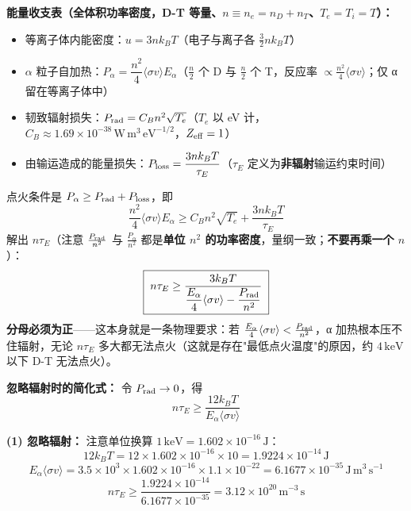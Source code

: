 \textbf{能量收支表（全体积功率密度，D-T 等量、$n\equiv n_e=n_D+n_T$、$T_e=T_i=T$）：}
\begin{itemize}
    \item 等离子体内能密度：$u=3nk_BT$（电子与离子各 $\tfrac32nk_BT$）
    \item $\alpha$ 粒子自加热：$P_\alpha=\dfrac{n^2}{4}\langle\sigma v\rangle E_\alpha$（$\tfrac{n}{2}$ 个 D 与 $\tfrac{n}{2}$ 个 T，反应率 $\propto \tfrac{n^2}{4}\langle\sigma v\rangle$；仅 α 留在等离子体中）
    \item 韧致辐射损失：$P_{\rm rad}=C_B n^2\sqrt{T_e}$（$T_e$ 以 eV 计，$C_B\approx1.69\times10^{-38}\,\mathrm{W\,m^3\,eV^{-1/2}}$，$Z_{\rm eff}=1$）
    \item 由输运造成的能量损失：$P_{\rm loss}=\dfrac{3nk_BT}{\tau_E}$（$\tau_E$ 定义为\textbf{非辐射}输运约束时间）
\end{itemize}
点火条件是 $P_\alpha\ge P_{\rm rad}+P_{\rm loss}$，即
\begin{equation}
    \frac{n^2}{4}\langle\sigma v\rangle E_\alpha \ge C_B n^2\sqrt{T_e} + \frac{3nk_BT}{\tau_E}
\label{eq:ch10-lawson-full}
\end{equation}
解出 $n\tau_E$（注意 $\tfrac{P_{\rm rad}}{n^2}$ 与 $\tfrac{P_\alpha}{n^2}$ 都是\textbf{单位 $n^2$ 的功率密度}，量纲一致；\textbf{不要再乘一个 $n$}）：
\begin{equation}
    \boxed{\;n\tau_E \ge \frac{3k_BT}{\dfrac{E_\alpha}{4}\langle\sigma v\rangle - \dfrac{P_{\rm rad}}{n^2}}\;}
\label{eq:ch10-lawson-full-solved}
\end{equation}
\textbf{分母必须为正}——这本身就是一条物理要求：若 $\tfrac{E_\alpha}{4}\langle\sigma v\rangle<\tfrac{P_{\rm rad}}{n^2}$，α 加热根本压不住辐射，无论 $n\tau_E$ 多大都无法点火（这就是存在"最低点火温度"的原因，约 $4\,\mathrm{keV}$ 以下 D-T 无法点火）。

\textbf{忽略辐射时的简化式：} 令 $P_{\rm rad}\to0$，得
\begin{equation}
    n\tau_E \ge \frac{12k_B T}{E_{\alpha}\langle\sigma v\rangle}
\label{eq:ch10-lawson-simplified}
\end{equation}

\textbf{(1) 忽略辐射：} 注意单位换算 $1\,\mathrm{keV}=1.602\times10^{-16}\,\mathrm{J}$：
\[
    12k_BT = 12\times1.602\times10^{-16}\times10 = 1.9224\times10^{-14}\,\mathrm{J}
\]
\[
    E_\alpha\langle\sigma v\rangle = 3.5\times10^3\times1.602\times10^{-16}\times1.1\times10^{-22}
    = 6.1677\times10^{-35}\,\mathrm{J\,m^3\,s^{-1}}
\]
\[
    n\tau_E \ge \frac{1.9224\times10^{-14}}{6.1677\times10^{-35}} = 3.12\times10^{20}\,\mathrm{m^{-3}\,s}
\]

